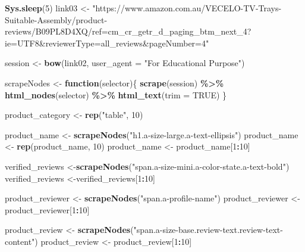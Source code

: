 \documentclass[
]{article}
\newenvironment{Shaded}{\begin{snugshade}}{\end{snugshade}}
\newcommand{\AttributeTok}[1]{\textcolor[rgb]{0.13,0.29,0.53}{#1}}
\newcommand{\ConstantTok}[1]{\textcolor[rgb]{0.56,0.35,0.01}{#1}}
\newcommand{\ControlFlowTok}[1]{\textcolor[rgb]{0.13,0.29,0.53}{\textbf{#1}}}
\newcommand{\DecValTok}[1]{\textcolor[rgb]{0.00,0.00,0.81}{#1}}
\newcommand{\FunctionTok}[1]{\textcolor[rgb]{0.13,0.29,0.53}{\textbf{#1}}}
\newcommand{\NormalTok}[1]{#1}
\newcommand{\OtherTok}[1]{\textcolor[rgb]{0.56,0.35,0.01}{#1}}
\newcommand{\SpecialCharTok}[1]{\textcolor[rgb]{0.81,0.36,0.00}{\textbf{#1}}}
\newcommand{\StringTok}[1]{\textcolor[rgb]{0.31,0.60,0.02}{#1}}
\begin{document}
\begin{Shaded}
\begin{Highlighting}[]
   \FunctionTok{Sys.sleep}\NormalTok{(}\DecValTok{5}\NormalTok{)}
\NormalTok{link03 }\OtherTok{\textless{}{-}} \StringTok{"https://www.amazon.com.au/VECELO{-}TV{-}Trays{-}Suitable{-}Assembly/product{-}reviews/B09PL8D4XQ/ref=cm\_cr\_getr\_d\_paging\_btm\_next\_4?ie=UTF8\&reviewerType=all\_reviews\&pageNumber=4"}


\NormalTok{  session }\OtherTok{\textless{}{-}} \FunctionTok{bow}\NormalTok{(link02,}
               \AttributeTok{user\_agent =} \StringTok{"For Educational Purpose"}\NormalTok{)}

\NormalTok{  scrapeNodes }\OtherTok{\textless{}{-}} \ControlFlowTok{function}\NormalTok{(selector)\{}
    \FunctionTok{scrape}\NormalTok{(session) }\SpecialCharTok{\%\textgreater{}\%}
      \FunctionTok{html\_nodes}\NormalTok{(selector) }\SpecialCharTok{\%\textgreater{}\%}
      \FunctionTok{html\_text}\NormalTok{(}\AttributeTok{trim =} \ConstantTok{TRUE}\NormalTok{)}
\NormalTok{  \}}

\NormalTok{  product\_category }\OtherTok{\textless{}{-}} \FunctionTok{rep}\NormalTok{(}\StringTok{"table"}\NormalTok{, }\DecValTok{10}\NormalTok{)}

\NormalTok{  product\_name }\OtherTok{\textless{}{-}} \FunctionTok{scrapeNodes}\NormalTok{(}\StringTok{"h1.a{-}size{-}large.a{-}text{-}ellipsis"}\NormalTok{)}
\NormalTok{  product\_name }\OtherTok{\textless{}{-}} \FunctionTok{rep}\NormalTok{(product\_name, }\DecValTok{10}\NormalTok{)}
\NormalTok{  product\_name }\OtherTok{\textless{}{-}}\NormalTok{ product\_name[}\DecValTok{1}\SpecialCharTok{:}\DecValTok{10}\NormalTok{]}
  
\NormalTok{  verified\_reviews }\OtherTok{\textless{}{-}}\FunctionTok{scrapeNodes}\NormalTok{(}\StringTok{"span.a{-}size{-}mini.a{-}color{-}state.a{-}text{-}bold"}\NormalTok{)}
\NormalTok{  verified\_reviews }\OtherTok{\textless{}{-}}\NormalTok{verified\_reviews[}\DecValTok{1}\SpecialCharTok{:}\DecValTok{10}\NormalTok{]}
  
\NormalTok{  product\_reviewer }\OtherTok{\textless{}{-}} \FunctionTok{scrapeNodes}\NormalTok{(}\StringTok{"span.a{-}profile{-}name"}\NormalTok{)}
\NormalTok{  product\_reviewer }\OtherTok{\textless{}{-}}\NormalTok{ product\_reviewer[}\DecValTok{1}\SpecialCharTok{:}\DecValTok{10}\NormalTok{]}
  
\NormalTok{  product\_review }\OtherTok{\textless{}{-}} \FunctionTok{scrapeNodes}\NormalTok{(}\StringTok{"span.a{-}size{-}base.review{-}text.review{-}text{-}content"}\NormalTok{)}
\NormalTok{  product\_review }\OtherTok{\textless{}{-}}\NormalTok{ product\_review[}\DecValTok{1}\SpecialCharTok{:}\DecValTok{10}\NormalTok{]}
  

\end{Highlighting}
\end{Shaded}
\end{document}
